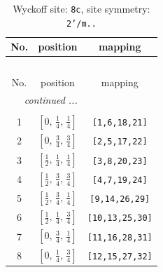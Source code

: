 \documentclass[fleqn,8pt]{jsarticle}
\begin{document}
\renewcommand{\arraystretch}{1.2}
\begin{longtable}{ccc}
\caption{Wyckoff site: {\tt 8c}, site symmetry: {\tt 2'/m..}}
 \\
 \hline \hline
No. & position & mapping \\ \hline \endfirsthead

\multicolumn{2}{l}{\tablename\ \thetable{}} \\
 \hline \hline
No. & position & mapping \\ \hline \endhead

 \hline \hline
\multicolumn{2}{r}{\footnotesize\it continued ...} \\ \endfoot

 \hline \hline
\multicolumn{2}{r}{} \\ \endlastfoot

1 & $\left[ 0,\, \frac{1}{4},\, \frac{1}{4} \right]$ & {\tt [1,6,18,21]} \\ \hline
2 & $\left[ 0,\, \frac{3}{4},\, \frac{3}{4} \right]$ & {\tt [2,5,17,22]} \\ \hline
3 & $\left[ \frac{1}{2},\, \frac{1}{4},\, \frac{1}{4} \right]$ & {\tt [3,8,20,23]} \\ \hline
4 & $\left[ \frac{1}{2},\, \frac{3}{4},\, \frac{3}{4} \right]$ & {\tt [4,7,19,24]} \\ \hline
5 & $\left[ \frac{1}{2},\, \frac{3}{4},\, \frac{1}{4} \right]$ & {\tt [9,14,26,29]} \\ \hline
6 & $\left[ \frac{1}{2},\, \frac{1}{4},\, \frac{3}{4} \right]$ & {\tt [10,13,25,30]} \\ \hline
7 & $\left[ 0,\, \frac{3}{4},\, \frac{1}{4} \right]$ & {\tt [11,16,28,31]} \\ \hline
8 & $\left[ 0,\, \frac{1}{4},\, \frac{3}{4} \right]$ & {\tt [12,15,27,32]} \\
\end{longtable}
\renewcommand{\arraystretch}{1.2}
\end{document}
